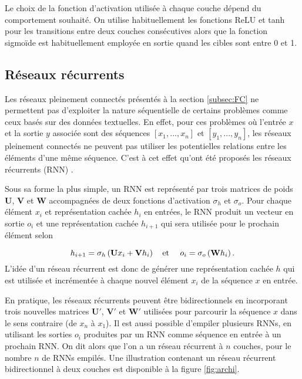 Le choix de la fonction d'activation utilisée à chaque couche dépend 
du comportement souhaité. 
On utilise habituellement les fonctions ReLU et tanh pour les
transitions entre deux couches consécutives alors que la fonction sigmoïde 
est habituellement employée en sortie quand les cibles sont entre 0 et 1.

\subsection{Réseaux récurrents}
\label{subsec:RNN}

Les réseaux pleinement connectés présentés à la section \ref{subsec:FC}
ne permettent pas d'exploiter la nature séquentielle de certains problèmes
comme ceux basés sur des données textuelles.
En effet, pour ces problèmes où l'entrée $x$ et la sortie $y$ associée sont 
des séquences $[x_1, ..., x_n]$ et $[y_1, ..., y_n]$, les réseaux 
pleinement connectés ne peuvent pas utiliser les potentielles 
relations entre les éléments d'une même séquence.
C'est à cet effet qu'ont été proposés les réseaux récurrents (RNN)
\citep{schuster1997bidirectional}.

Sous sa forme la plus simple, un RNN est représenté par trois matrices
de poids $\mathbf{U}$, $\mathbf{V}$ et $\mathbf{W}$ accompagnées de deux fonctions 
d'activation $\sigma_h$ et $\sigma_o$.
Pour chaque élément $x_i$ et représentation cachée $h_i$ en entrées, le RNN produit un vecteur 
en sortie $o_i$ et une représentation cachée $h_{i+1}$ qui sera utilisée pour 
le prochain élément selon 

\begin{equation*}
    h_{i+1} = \sigma_h\left(\mathbf{U}x_i + \mathbf{V}h_i\right) \text{\quad et \quad}
    o_i = \sigma_o\left(\mathbf{W}h_i\right).
\end{equation*}
L'idée d'un réseau récurrent est donc de générer une représentation cachée $h$
qui est utilisée et incrémentée à chaque nouvel élément $x_i$ de la séquence $x$ en entrée.

En pratique, les réseaux récurrents peuvent être bidirectionnels en incorporant 
trois nouvelles matrices $\mathbf{U}'$, $\mathbf{V}'$ et $\mathbf{W}'$ utilisées 
pour parcourir la séquence $x$ dans le sens contraire (de $x_n$ à $x_1$).
Il est aussi possible d'empiler plusieurs RNNs, en utilisant les sorties $o_i$
produites par un RNN comme séquence en entrée à un prochain RNN.
On dit alors que l'on a un réseau récurrent à $n$ couches, pour le nombre 
$n$ de RNNs empilés.
Une illustration contenant un réseau récurrent bidirectionnel à deux couches est disponible
à la figure \ref{fig:archi}.

